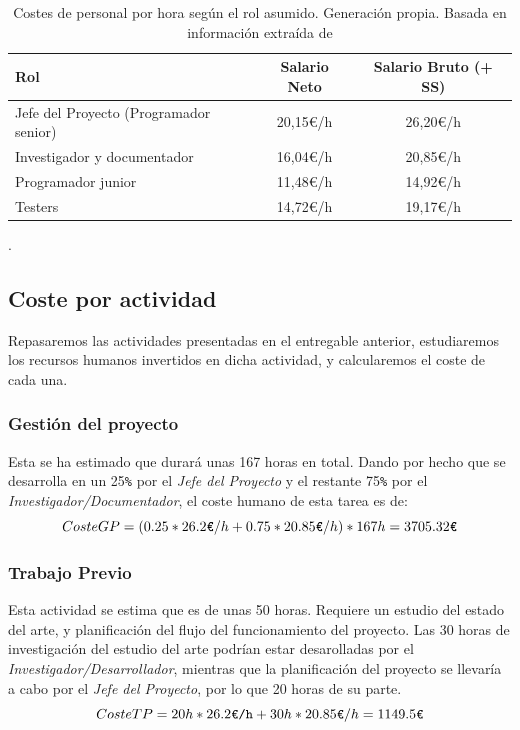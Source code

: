 \documentclass[11pt, letterpaper]{article}
\begin{document}
\begin{table}[H]
    \centering
    \begin{tabularx}{\textwidth}{|X|c|c|}
         \hline
         \textbf{Rol} & \textbf{Salario Neto} & \textbf{Salario Bruto (+ SS)}\\ 
         \hline
         \hline
         Jefe del Proyecto (Programador senior) & 20,15€/h & 26,20€/h \\
         Investigador y documentador & 16,04€/h & 20,85€/h \\
         Programador junior &  11,48€/h & 14,92€/h \\
         Testers & 14,72€/h & 19,17€/h \\
         \hline
    \end{tabularx}
    \caption{Costes de personal por hora según el rol asumido. Generación propia. Basada en información extraída de \cite{indeed_salarios}}.
    \label{tab:costes_personal}
\end{table}

\subsection{Coste por actividad}
Repasaremos las actividades presentadas en el entregable anterior, estudiaremos los recursos humanos invertidos en dicha actividad, y calcularemos el coste de cada una.
\subsubsection{Gestión del proyecto}
Esta se ha estimado que durará unas 167 horas en total. Dando por hecho que se desarrolla en un 25\verb|%| por el \textit{Jefe del Proyecto} y el restante 75\verb|%| por el \textit{Investigador/Documentador}, el coste humano de esta tarea es de: 
\begin{equation}
\centering
Coste GP = (0{.}25*26{.}2 \verb|€|/h + 0{.}75*20{.}85 \verb|€|/h)*167h = 3705{.}32\verb|€|
\end{equation}
\subsubsection{Trabajo Previo}
Esta actividad se estima que es de unas 50 horas. Requiere un estudio del estado del arte, y planificación del flujo del funcionamiento del proyecto. Las 30 horas de investigación del estudio del arte podrían estar desarolladas por el \textit{Investigador/Desarrollador}, mientras que la planificación del proyecto se llevaría a cabo por el \textit{Jefe del Proyecto}, por lo que 20 horas de su parte.
\begin{equation}
    Coste TP = 20h * 26{.}2\verb|€/h| + 30h * 20{.}85\verb|€|/h = 1149{.}5\verb|€|
\end{equation}
\end{document}
